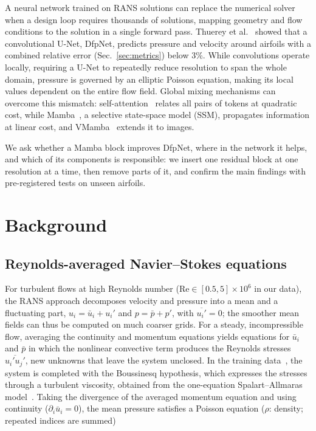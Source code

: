 \documentclass[conference]{IEEEtran}
\begin{document}
A neural network trained on RANS solutions can replace the numerical solver when a design loop requires thousands of solutions, mapping geometry and flow conditions to the solution in a single forward pass. Thuerey et al.~\cite{thuerey2020} showed
that a convolutional U-Net, DfpNet, predicts pressure and velocity around
airfoils with a combined relative error (Sec.~\ref{sec:metrics}) below 3\%. While convolutions operate locally, requiring a U-Net to repeatedly reduce resolution to span the whole domain, pressure is governed by an elliptic Poisson equation, making its local values dependent on the entire flow field. Global mixing
mechanisms can overcome this mismatch: self-attention~\cite{vaswani2017} relates all pairs of tokens at quadratic cost, while Mamba~\cite{gu2024mamba}, a selective state-space model (SSM), propagates information at linear cost, and VMamba~\cite{liu2024vmamba} extends it to images.

We ask whether a Mamba block improves DfpNet, where in the network it helps,
and which of its components is responsible: we insert one residual block at
one resolution at a time, then remove parts of it, and confirm the main
findings with pre-registered tests on unseen airfoils.

\section{Background}
\label{sec:background}

\subsection{Reynolds-averaged Navier--Stokes equations}
\label{sec:rans}

For turbulent flows at high Reynolds number ($\mathrm{Re}\in[0.5,5]\times10^6$
in our data), the RANS approach decomposes velocity and pressure into a mean and a
fluctuating part, $u_i=\bar u_i+u_i'$ and $p=\bar p+p'$, with
$\overline{u_i'}=0$; the smoother mean fields can thus be computed on much coarser grids. For a steady, incompressible flow, averaging the continuity and momentum equations yields equations for $\bar u_i$ and $\bar p$ in which the nonlinear convective term produces the Reynolds stresses $\overline{u_i'u_j'}$, new unknowns that leave the system unclosed. In the
training data~\cite{thuerey2020}, the system is completed with the Boussinesq hypothesis, which expresses the stresses through a turbulent viscosity, obtained from the one-equation Spalart--Allmaras model~\cite{spalart1992}. Taking the divergence of the averaged momentum equation and using continuity ($\partial_i\bar u_i=0$), the mean pressure satisfies a Poisson equation ($\rho$: density; repeated indices are summed)
\end{document}
